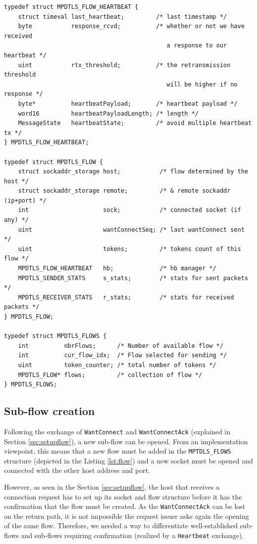\begin{lstlisting}[caption=Structures handling flows, label=lst:flow]
typedef struct MPDTLS_FLOW_HEARTBEAT {
    struct timeval last_heartbeat;         /* last timestamp */
    byte           response_rcvd;          /* whether or not we have received
                                              a response to our heartbeat */
    uint           rtx_threshold;          /* the retransmission threshold
                                              will be higher if no response */
    byte*          heartbeatPayload;       /* heartbeat payload */
    word16         heartbeatPayloadLength; /* length */
    MessageState   heartbeatState;         /* avoid multiple heartbeat tx */
} MPDTLS_FLOW_HEARTBEAT;

typedef struct MPDTLS_FLOW {
    struct sockaddr_storage host;           /* flow determined by the host */
    struct sockaddr_storage remote;         /* & remote sockaddr (ip+port) */
    int                     sock;           /* connected socket (if any) */
    uint                    wantConnectSeq; /* last wantConnect sent */
    uint                    tokens;         /* tokens count of this flow */
    MPDTLS_FLOW_HEARTBEAT   hb;             /* hb manager */
    MPDTLS_SENDER_STATS     s_stats;        /* stats for sent packets */
    MPDTLS_RECEIVER_STATS   r_stats;        /* stats for received packets */
} MPDTLS_FLOW;

typedef struct MPDTLS_FLOWS {
    int          nbrFlows;      /* Number of available flow */
    int          cur_flow_idx;  /* Flow selected for sending */
    uint         token_counter; /* total number of tokens */
    MPDTLS_FLOW* flows;         /* collection of flow */
} MPDTLS_FLOWS;
\end{lstlisting}

\subsection{Sub-flow creation}

Following the exchange of \texttt{WantConnect} and \texttt{WantConnectAck} (explained in Section \ref{sec:setupflow}), a new sub-flow can be opened. From an implementation viewpoint, this means that a new flow must be added in the \texttt{MPTDLS\_FLOWS} structure (depicted in the Listing \ref{lst:flow}) and a new socket must be opened and connected with the other host address and port.

However, as seen in the Section \ref{sec:setupflow}, the host that receives a connection request has to set up its socket and flow structure before it has the confirmation that the flow must be created. As the \texttt{WantConnectAck} can be lost on the return path, it is not impossible the request issuer asks again the opening of the same flow. Therefore, we needed a way to differentiate well-established sub-flows and sub-flows requiring confirmation (realized by a \texttt{Heartbeat} exchange).

